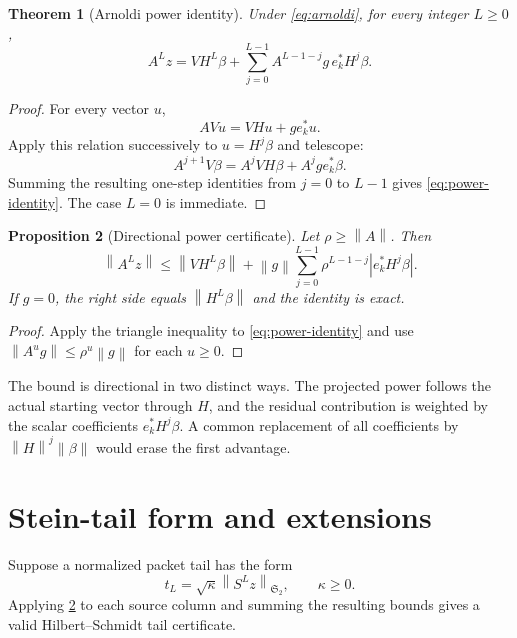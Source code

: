 \documentclass[11pt]{article}
\newtheorem{theorem}{Theorem}[section]
\newtheorem{proposition}[theorem]{Proposition}
\newcommand{\norm}[1]{\left\lVert#1\right\rVert}
\newcommand{\HS}{\mathfrak S_2}
\begin{document}
\begin{theorem}[Arnoldi power identity]
\label{thm:identity}
Under \eqref{eq:arnoldi}, for every integer $L\ge0$,
\begin{equation}
 A^Lz=VH^L\beta+
 \sum_{j=0}^{L-1}A^{L-1-j}g\,e_k^*H^j\beta.
 \label{eq:power-identity}
\end{equation}
\end{theorem}

\begin{proof}
For every vector $u$,
\[
 AVu=VHu+g e_k^*u.
\]
Apply this relation successively to $u=H^j\beta$ and telescope:
\[
 A^{j+1}V\beta=A^jVH\beta+A^jg e_k^*\beta.
\]
Summing the resulting one-step identities from $j=0$ to $L-1$ gives
\eqref{eq:power-identity}.  The case $L=0$ is immediate.
\end{proof}

\begin{proposition}[Directional power certificate]
\label{prop:certificate}
Let $\rho\ge\norm A$.  Then
\begin{equation}
\norm{A^Lz}
\le
\norm{VH^L\beta}
 +\norm g\sum_{j=0}^{L-1}
 \rho^{L-1-j}\left|e_k^*H^j\beta\right|.
\label{eq:power-upper}
\end{equation}
If $g=0$, the right side equals $\norm{H^L\beta}$ and the identity is
exact.
\end{proposition}

\begin{proof}
Apply the triangle inequality to \eqref{eq:power-identity} and use
$\norm{A^u g}\le\rho^u\norm g$ for each $u\ge0$.
\end{proof}

The bound is directional in two distinct ways.  The projected power follows
the actual starting vector through $H$, and the residual contribution is
weighted by the scalar coefficients $e_k^*H^j\beta$.  A common replacement
of all coefficients by $\norm{H}^j\norm\beta$ would erase the first
advantage.

\section{Stein-tail form and extensions}
\label{sec:stein}

Suppose a normalized packet tail has the form
\begin{equation}
 t_L=\sqrt{\kappa}\norm{S^Lz}_{\HS},
 \qquad \kappa\ge0.
\label{eq:stein-tail}
\end{equation}
Applying \cref{prop:certificate} to each source column and summing the
resulting bounds gives a valid Hilbert--Schmidt tail certificate.
\end{document}
